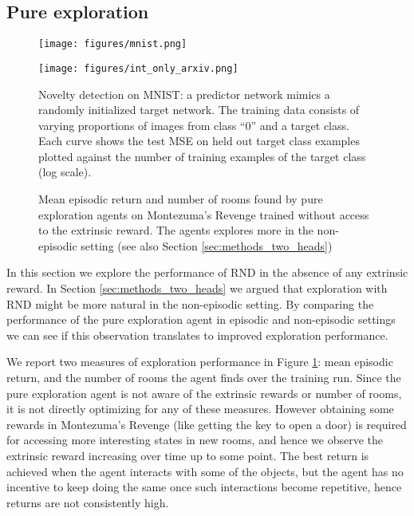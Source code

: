 \documentclass{article} \usepackage[dvipsnames]{xcolor}
\begin{document}
\subsection{Pure exploration}
\label{sec:int_only_exp}
\begin{figure}[t]
\begin{minipage}[t]{0.5\linewidth}
\centering
\vspace{0pt}
\texttt{[image: figures/mnist.png]}
\end{minipage}\hspace{.02\textwidth}
\begin{minipage}[t]{0.46\linewidth}
\centering
\vspace{0pt}
\texttt{[image: figures/int\_only\_arxiv.png]}
\end{minipage}\par
\begin{minipage}[t]{0.5\linewidth}
\caption{Novelty detection on MNIST: a predictor network mimics a randomly initialized target network. The training data consists of varying proportions of images from class ``0'' and a target class. Each curve shows the test MSE on held out target class examples plotted against the number of training examples of the target class (log scale).}
\label{fig:mnist}
\end{minipage}\hspace{.02\textwidth}
\begin{minipage}[t]{0.46\linewidth}
\caption{Mean episodic return and number of rooms found by pure exploration agents on Montezuma's Revenge trained without access to the extrinsic reward. The agents explores more in the non-episodic setting (see also Section \ref{sec:methods_two_heads})}
\label{fig:int_only}
\end{minipage}\vspace*{-20pt}
\end{figure}
In this section we explore the performance of RND in the absence of any extrinsic reward. In Section \ref{sec:methods_two_heads} we argued that exploration with RND might be more natural in the non-episodic setting. By comparing the performance of the pure exploration agent in episodic and non-episodic settings we can see if this observation translates to improved exploration performance.

We report two measures of exploration performance in Figure \ref{fig:int_only}: mean episodic return, and the number of rooms the agent finds over the training run. Since the pure exploration agent is not aware of the extrinsic rewards or number of rooms, it is not directly optimizing for any of these measures. However obtaining some rewards in Montezuma's Revenge (like getting the key to open a door) is required for accessing more interesting states in new rooms, and hence we observe the extrinsic reward increasing over time up to some point. The best return is achieved when the agent interacts with some of the objects, but the agent has no incentive to keep doing the same once such interactions become repetitive, hence returns are not consistently high.
\end{document}
